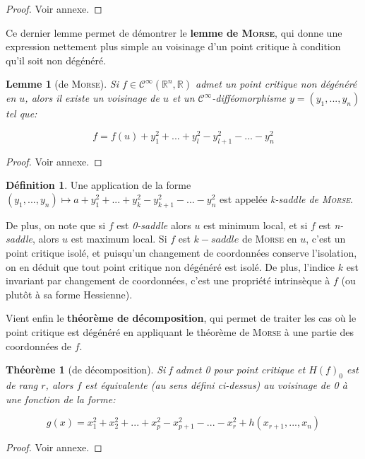 \documentclass{article}
\newcommand{\cinf}{\mathcal{C}^\infty}
\newcommand{\R}{\mathbb{R}}
\newtheorem{thm}{Théorème}
\newtheorem{lemm}{Lemme}
\theoremstyle{definition}
\newtheorem{defn}{Définition}
\begin{document}
\begin{proof} Voir annexe. \end{proof}

Ce dernier lemme permet de démontrer le \textbf{lemme de \textsc{Morse}}, qui donne une expression nettement plus simple au voisinage d'un point critique à condition qu'il soit non dégénéré.

\begin{lemm}[de \textsc{Morse}]
	Si $f\in\cinf(\R^n,\R)$ admet un point critique non dégénéré en $u$, alors il existe un voisinage de $u$ et un $\cinf$-difféomorphisme $y=(y_1,...,y_n)$ tel que:

	$$f=f(u)+y_1^2+...+y_l^2-y_{l+1}^2-...-y_n^2$$
\end{lemm}

\begin{proof} Voir annexe. \end{proof}

\begin{defn}
	Une application de la forme $(y_1,...,y_n)\mapsto a+y_1^2+...+y_k^2-y_{k+1}^2-...-y_n^2$ est appelée \textit{k-saddle de \textsc{Morse}}.
\end{defn}

De plus, on note que si $f$ est \textit{0-saddle} alors $u$ est minimum local, et si $f$ est \textit{n-saddle}, alors $u$ est maximum local.
Si $f$ est $k-saddle$ de \textsc{Morse} en $u$, c'est un point critique isolé, et puisqu'un changement de coordonnées conserve l'isolation, on en déduit que tout point critique non dégénéré est isolé.
De plus, l'indice $k$ est invariant par changement de coordonnées, c'est une propriété intrinsèque à $f$ (ou plutôt à sa forme Hessienne).

Vient enfin le \textbf{théorème de décomposition}, qui permet de traiter les cas où le point critique est dégénéré en appliquant le théorème de \textsc{Morse} à une partie des coordonnées de $f$.

\begin{thm}[de décomposition]
	Si f admet 0 pour point critique et $H(f)_0$ est de rang $r$, alors $f$ est équivalente (au sens défini ci-dessus) au voisinage de 0 à une fonction de la forme:

	$$g(x)= x_1^2+x_2^2+ ...+x_p^2-x_{p+1}^2 -...- x_r^2 + h(x_{r+1},...,x_n)$$
\end{thm}

\begin{proof} Voir annexe. \end{proof}
\end{document}
